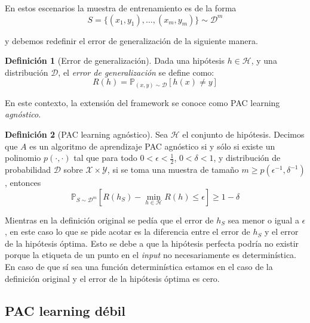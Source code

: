 \documentclass{article}
\theoremstyle{definition}
\newtheorem{definition}{Definici\'on}%
\begin{document}
En estos escenarios la muestra de entrenamiento es de la forma
$$
S = \{(x_1, y_1), \dots, (x_m, y_m)\} \sim \mathcal{D}^m
$$

y debemos redefinir el error de generalizaci\'on de la siguiente manera.

\begin{definition}[Error de generalizaci\'on]
    Dada una hip\'otesis $h \in \mathcal{H}$, y una distribuci\'on $\mathcal{D}$, el \emph{error de generalizaci\'on} se define como: 
    $$
    R(h) = \mathbb{P}_{(x,y) \sim \mathcal{D}}[h(x) \neq y]
    $$
\end{definition}

En este contexto, la extensi\'on del framework se conoce como PAC learning \emph{agn\'ostico}.

\begin{definition}[PAC learning agn\'ostico]
    \label{def:pac-agnostico}
    Sea $\mathcal{H}$ el conjunto de hip\'otesis. Decimos que $A$ es un algoritmo de aprendizaje PAC agn\'ostico si y s\'olo si existe un polinomio $p(\cdot, \cdot)$ tal que para todo $0 < \epsilon < \frac{1}{2}$, $0 < \delta < 1$, y distribuci\'on de probabilidad $\mathcal{D}$ sobre $\mathcal{X} \times \mathcal{Y}$, si se toma una muestra de tama\~no $m \geq p(\epsilon^{-1}, \delta^{-1})$, entonces
    $$
    \mathbb{P}_{S\sim\mathcal{D}^m}[R(h_S) - \min_{h \in \mathcal{H}} R(h) \leq \epsilon] \geq 1 - \delta
    $$
\end{definition}

Mientras en la definici\'on original se ped\'ia que el error de $h_S$ sea menor o igual a $\epsilon$, en este caso lo que se pide acotar es la diferencia entre el error de $h_S$ y el error de la hip\'otesis \'optima. Esto se debe a que la hip\'otesis perfecta podr\'ia no existir porque la etiqueta de un punto en el \emph{input} no necesariamente es determin\'istica. En caso de que s\'i sea una funci\'on determin\'istica estamos en el caso de la definici\'on original y el error de la hip\'otesis \'optima es cero.

\subsection{PAC learning d\'ebil}

\end{document}
